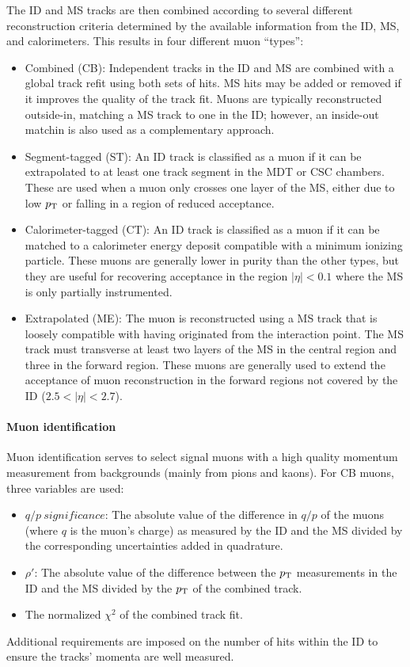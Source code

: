 The ID and MS tracks are then combined according to several different reconstruction criteria determined by the available information from the ID, MS, and calorimeters.
This results in four different muon ``types'':
\begin{itemize}
  \item Combined (CB): Independent tracks in the ID and MS are combined with a global track refit using both sets of hits.
MS hits may be added or removed if it improves the quality of the track fit.
Muons are typically reconstructed outside-in, matching a MS track to one in the ID; however, an inside-out matchin is also used as a complementary approach.
  \item Segment-tagged (ST): An ID track is classified as a muon if it can be extrapolated to at least one track segment in the MDT or CSC chambers.
These are used when a muon only crosses one layer of the MS, either due to low $p_{\mathrm{T}}$ or falling in a region of reduced acceptance.
  \item Calorimeter-tagged (CT): An ID track is classified as a muon if it can be matched to a calorimeter energy deposit compatible with a minimum ionizing particle.
These muons are generally lower in purity than the other types, but they are useful for recovering acceptance in the region $|\eta| < 0.1$ where the MS is only partially instrumented.
  \item Extrapolated (ME): The muon is reconstructed using a MS track that is loosely compatible with having originated from the interaction point.
The MS track must transverse at least two layers of the MS in the central region and three in the forward region.
These muons are generally used to extend the acceptance of muon reconstruction in the forward regions not covered by the ID ($2.5 < |\eta| < 2.7$).
\end{itemize}

\paragraph*{Muon identification}
Muon identification serves to select signal muons with a high quality momentum measurement from backgrounds (mainly from pions and kaons).
For CB muons, three variables are used:
\begin{itemize}
  \item $q/p\ significance$: The absolute value of the difference in $q/p$ of the muons (where $q$ is the muon's charge) as measured by the ID and the MS divided by the corresponding uncertainties added in quadrature.
  \item $\rho'$: The absolute value of the difference between the $p_{\mathrm{T}}$ measurements in the ID and the MS divided by the $p_{\mathrm{T}}$ of the combined track.
  \item The normalized $\chi^2$ of the combined track fit.
\end{itemize}
Additional requirements are imposed on the number of hits within the ID to ensure the tracks' momenta are well measured.

